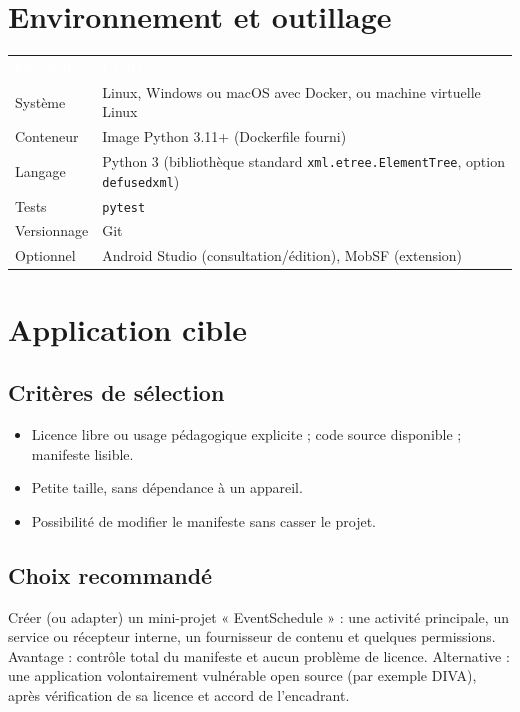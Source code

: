 \documentclass[11pt,a4paper]{article}
\newcommand{\code}[1]{{\NoAutoSpacing\texttt{\small #1}}}
\newcommand{\code}[1]{{\texttt{\small #1}}}
\newcommand{\hd}[1]{\textcolor{white}{\textbf{#1}}}
\begin{document}
\section{Environnement et outillage}
\begin{center}
\begin{tabular}{L{3.6cm}L{11cm}}
\hd{Élément} & \hd{Choix}\\
Système & Linux, Windows ou macOS avec Docker, ou machine virtuelle Linux\\
Conteneur & Image Python 3.11+ (Dockerfile fourni)\\
Langage & Python 3 (bibliothèque standard \code{xml.etree.ElementTree}, option \code{defusedxml})\\
Tests & \code{pytest}\\
Versionnage & Git\\
Optionnel & Android Studio (consultation/édition), MobSF (extension)\\
\end{tabular}
\end{center}

\section{Application cible}

\subsection{Critères de sélection}
\begin{itemize}
  \item Licence libre ou usage pédagogique explicite ; code source disponible ; manifeste lisible.
  \item Petite taille, sans dépendance à un appareil.
  \item Possibilité de modifier le manifeste sans casser le projet.
\end{itemize}

\subsection{Choix recommandé}
Créer (ou adapter) un mini-projet « EventSchedule » : une activité principale, un service ou récepteur interne, un fournisseur de contenu et quelques permissions. Avantage : contrôle total du manifeste et aucun problème de licence. Alternative : une application volontairement vulnérable open source (par exemple DIVA), après vérification de sa licence et accord de l'encadrant.
\end{document}
